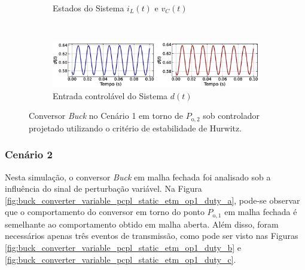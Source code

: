 \begin{figure}[H]
\begin{subfigure}{1.\textwidth}
    \caption{Estados do Sistema $i_L(t)$  e $v_C(t)$}
  \end{subfigure}
  \\[6pt]
  \begin{subfigure}{1.\textwidth}
    \centering
    \includegraphics[width=1.\textwidth]{figuras/classic/buck/sim1/op2/duty-cycle.eps}
    \caption{Entrada controlável do Sistema $d(t)$}
  \end{subfigure}
  \caption{Conversor \textit{Buck} no Cenário 1 em torno de $P_{\mathrm{o}, 2}$ sob controlador projetado utilizando o critério de estabilidade de Hurwitz.}
  \label{fig:classic_buck_cen1_op2}
\end{figure}

\subsubsection{Cenário 2}

Nesta simulação, o conversor \textit{Buck} em malha fechada foi analisado sob a influência do sinal de perturbação variável. Na Figura \ref{fig:buck_converter_variable_pcpl_static_etm_op1_duty_a}, pode-se observar que o comportamento do conversor em torno do ponto $P_{\mathrm{o}, 1}$ em malha fechada é semelhante ao comportamento obtido em malha aberta. Além disso, foram necessários apenas três eventos de transmissão, como pode ser visto nas Figuras \ref{fig:buck_converter_variable_pcpl_static_etm_op1_duty_b} e \ref{fig:buck_converter_variable_pcpl_static_etm_op1_duty_c}.

